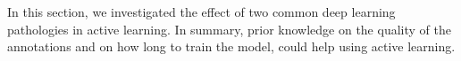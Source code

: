 \documentclass{article}
\newcommand{\std}[1]{ \normalfont \color{darkgray}\footnotesize{$\pm$#1} }
\begin{document}
    
    


In this section, we investigated the effect of two common deep learning pathologies in active learning. In summary, prior knowledge on the quality of the annotations and on how long to train the model, could help using active learning. 
\end{document}
